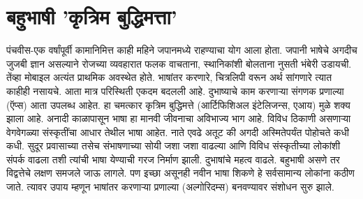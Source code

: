 \chapter{बहुभाषी 'कृत्रिम बुद्धिमत्ता'}

पंचवीस-एक वर्षांपूर्वी कामानिमित्त काही महिने जपानमध्ये राहण्याचा योग आला होता. जपानी भाषेचे अगदीच जुजबी ज्ञान असल्याने रोजच्या व्यवहारात फलक वाचताना, स्थानिकांशी बोलताना नुसती भंबेरी उडायची. तेंव्हा मोबाइल अत्यंत प्राथमिक अवस्थेत होते. भाषांतर करणारे, चित्रलिपी वरून अर्थ सांगणारे त्यात काहीही नसायचे. आता मात्र परिस्थिती एकदम बदलली आहे. दुभाष्याचे काम करणाऱ्या संगणक प्रणाल्या (ऍप्स) आता उपलब्ध आहेत. हा चमत्कार कृत्रिम बुद्धिमत्ते (आर्टिफिशिअल इंटेलिजन्स, एआय) मुळे शक्य झाला आहे.  अनादी काळापासून भाषा हा मानवी जीवनाचा अविभाज्य भाग आहे. विविध ठिकाणी असणाऱ्या वेगवेगळ्या संस्कृतींचा आधार तेथील भाषा आहेत. नाते एवढे अतूट की अगदी अस्मितेपर्यंत पोहोचते कधी कधी. सुदूर प्रवासाच्या तसेच संभाषणाच्या सोयी जशा जशा वाढल्या आणि विविध संस्कृतीच्या लोकांशी संपर्क वाढला तशी त्यांची भाषा येण्याची गरज निर्माण झाली. दुभाषांचे महत्व वाढले. बहुभाषी असणे तर विद्वत्तेचे लक्षण समजले जाऊ लागले. पण इच्छा असूनही नवीन भाषा शिकणे हे सर्वसामान्य लोकांना कठीण जाते. त्यावर उपाय म्हणून भाषांतर करणाऱ्या प्रणाल्या (अल्गोरिदम्स) बनवण्यावर संशोधन सुरु झाले.

